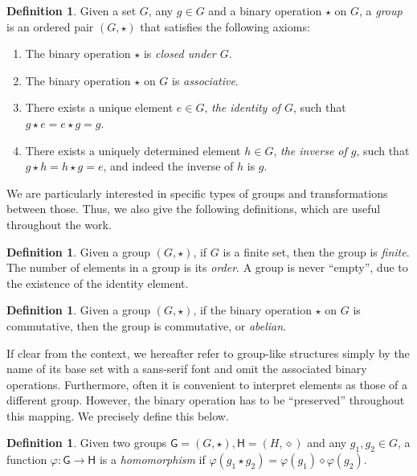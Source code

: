 \documentclass[12pt, a4paper, oneside]{memoir}
\theoremstyle{definition}
\newtheorem{definition}[theorem]{Definition}
\begin{document}
\begin{definition}
  Given a set $G$, any $g \in G$ and a binary operation $\star$ on $G$, a \emph{group} is an ordered pair $(G, \star)$ that satisfies the following axioms:
  
  \begin{enumerate}
    \item The binary operation $\star$ is \emph{closed under $G$}.
    \item The binary operation $\star$ on $G$ is \emph{associative}.
    \item There exists a unique element $e \in G$, \emph{the identity of $G$}, such that $g \star e = e \star g = g$.
    \item There exists a uniquely determined element $h \in G$, \emph{the inverse of $g$}, such that $g \star h = h \star g = e$, and indeed the inverse of $h$ is $g$.
  \end{enumerate}
\end{definition}

We are particularly interested in specific types of groups and transformations between those. Thus, we also give the following definitions, which are useful throughout the work.

\begin{definition}
  Given a group $(G, \star)$, if $G$ is a finite set, then the group is \emph{finite}. The number of elements in a group is its \emph{order}. A group is never ``empty'', due to the existence of the identity element.
\end{definition}

\begin{definition}
  Given a group $(G, \star)$, if the binary operation $\star$ on $G$ is commutative, then the group is commutative, or \emph{abelian}.
\end{definition}

If clear from the context, we hereafter refer to group-like structures simply by the name of its base set with a sans-serif font and omit the associated binary operations. Furthermore, often it is convenient to interpret elements as those of a different group. However, the binary operation has to be ``preserved'' throughout this mapping. We precisely define this below.

\begin{definition}\label{def:ghom}
  Given two groups $\mathsf{G} = (G, \star), \mathsf{H} = (H, \diamond)$ and any $g_{1}, g_{2} \in G$, a function $\varphi : \mathsf{G} \to \mathsf{H}$ is a \emph{homomorphism} if $\varphi(g_{1} \star g_{2}) = \varphi(g_{1}) \diamond \varphi(g_{2})$.
\end{definition}
\end{document}
